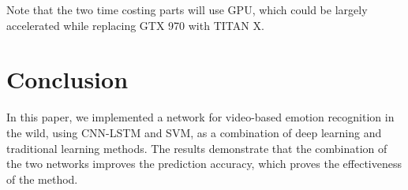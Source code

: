 \documentclass[10pt,twocolumn,letterpaper]{article}
\begin{document}
Note that the two time costing parts will use GPU, which could be largely accelerated while replacing GTX 970 with TITAN X.

\section{Conclusion}

In this paper, we implemented a network for video-based emotion recognition in the wild, using CNN-LSTM and SVM, as a combination of deep learning and traditional learning methods. The results demonstrate that the combination of the two networks improves the prediction accuracy, which proves the effectiveness of the method.

{\small


}
\end{document}
